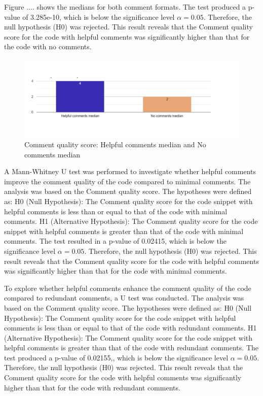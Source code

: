 Figure .... shows the medians for both comment formats.
The test produced a p-value of 3.285e-10, which is below the significance level $\alpha = 0.05$. Therefore, the null hypothesis (H0) was rejected. This result reveals that the Comment quality score for the code with helpful comments was significantly higher than that for the code with no comments.

\begin{figure} [H]
  \centering
  \includegraphics[scale=0.5]{figures/h-0-q4.png}
  \caption{Comment quality score: Helpful comments median and No comments median}
  \label{fig:AnhangsChor}
\end{figure}


A Mann-Whitney U test was performed to investigate whether helpful comments improve the comment quality of the code compared to minimal comments. The analysis was based on the Comment quality score. The hypotheses were defined as: H0 (Null Hypothesis): The Comment quality score for the code snippet with helpful comments is less than or equal to that of the code with minimal comments.  H1 (Alternative Hypothesis): The Comment quality score for the code snippet with helpful comments is greater than that of the code with minimal comments. The test resulted in a p-value of 0.02415, which is below the significance level $\alpha = 0.05$. Therefore, the null hypothesis (H0) was rejected. This result reveals that the Comment quality score for the code with helpful comments was significantly higher than that for the code with minimal comments.





To explore whether helpful comments enhance the comment quality of the code compared to redundant comments, a  U test was conducted.  The analysis was based on the Comment quality score. The hypotheses were defined as: H0 (Null Hypothesis): The Comment quality score for the code snippet with helpful comments is less than or equal to that of the code with redundant comments.  H1 (Alternative Hypothesis): The Comment quality score for the code snippet with helpful comments is greater than that of the code with redundant comments. The test produced a p-value of 0.02155,, which is below the significance level $\alpha = 0.05$. Therefore, the null hypothesis (H0) was rejected. This result reveals that the Comment quality score for the code with helpful comments was significantly higher than that for the code with redundant comments. 



